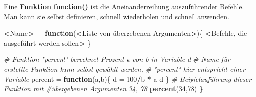 \documentclass[]{book}
\newenvironment{Shaded}{\begin{snugshade}}{\end{snugshade}}
\newcommand{\KeywordTok}[1]{\textcolor[rgb]{0.13,0.29,0.53}{\textbf{#1}}}
\newcommand{\DecValTok}[1]{\textcolor[rgb]{0.00,0.00,0.81}{#1}}
\newcommand{\StringTok}[1]{\textcolor[rgb]{0.31,0.60,0.02}{#1}}
\newcommand{\CommentTok}[1]{\textcolor[rgb]{0.56,0.35,0.01}{\textit{#1}}}
\newcommand{\ControlFlowTok}[1]{\textcolor[rgb]{0.13,0.29,0.53}{\textbf{#1}}}
\newcommand{\OperatorTok}[1]{\textcolor[rgb]{0.81,0.36,0.00}{\textbf{#1}}}
\newcommand{\ErrorTok}[1]{\textcolor[rgb]{0.64,0.00,0.00}{\textbf{#1}}}
\newcommand{\NormalTok}[1]{#1}
\begin{document}
\begin{Shaded}
\end{Shaded}

Eine \textbf{Funktion} \textbf{function()} ist die Aneinanderreihung
auszuführender Befehle. Man kann sie selbst definieren, schnell
wiederholen und schnell anwenden.

\begin{Shaded}
\begin{Highlighting}[]
\OperatorTok{<}\NormalTok{Name}\OperatorTok{>}\StringTok{ }\ErrorTok{=}\StringTok{ }\ControlFlowTok{function}\NormalTok{(}\OperatorTok{<}\NormalTok{Liste von übergebenen Argumenten}\OperatorTok{>}\NormalTok{)\{}
  \OperatorTok{<}\NormalTok{Befehle, die ausgeführt werden sollen}\OperatorTok{>}
\NormalTok{\}}


\CommentTok{# Funktion "percent" berechnet Prozent a von b in Variable d}
\CommentTok{# Name für erstellte Funktion kann selbst gewählt werden, }
\CommentTok{# "percent" hier entspricht einer Variable}
\NormalTok{percent =}\StringTok{ }\ControlFlowTok{function}\NormalTok{(a,b)\{ }
\NormalTok{    d =}\StringTok{ }\DecValTok{100}\OperatorTok{/}\NormalTok{b }\OperatorTok{*}\StringTok{ }\NormalTok{a}
\NormalTok{    d}
\NormalTok{\}}
\CommentTok{# Beipielauführung dieser Funktion mit }
\CommentTok{#übergebenen Argumenten 34, 78}
\KeywordTok{percent}\NormalTok{(}\DecValTok{34}\NormalTok{,}\DecValTok{78}\NormalTok{)}
\ErrorTok{\}}
\end{Highlighting}
\end{Shaded}
\end{document}
